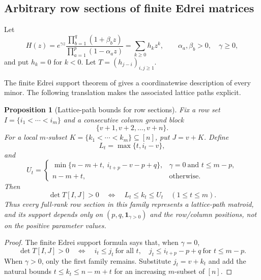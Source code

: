 \documentclass[11pt]{amsart}
\newtheorem{proposition}[theorem]{Proposition}
\theoremstyle{definition}
\theoremstyle{remark}
\newcommand{\one}{\mathbf 1}
\begin{document}
\subsection{Arbitrary row sections of finite Edrei matrices}

Let
\begin{equation}\label{eq:Edrei-H}
 H(z)=e^{\gamma z}
 \frac{\prod_{b=1}^{q}(1+\beta_bz)}
 {\prod_{a=1}^{p}(1-\alpha_az)}
 =\sum_{k\ge0}h_kz^k,
 \qquad \alpha_a,\beta_b>0,\quad\gamma\ge0,
\end{equation}
and put $h_k=0$ for $k<0$.  Let $T=(h_{j-i})_{i,j\ge1}$.

The finite Edrei support theorem of \cite[Theorem~23]{CGQlow} gives a coordinatewise description of every minor.  The following translation makes the associated lattice paths explicit.

\begin{proposition}[Lattice-path bounds for row sections]\label{prop:Edrei-lattice}
Fix a row set $I=\{i_1<\cdots<i_m\}$ and a consecutive column ground block
\[
 \{v+1,v+2,\ldots,v+n\}.
\]
For a local $m$-subset $K=\{k_1<\cdots<k_m\}\subseteq[n]$, put $J=v+K$.  Define
\begin{equation}\label{eq:Edrei-L}
 L_t=\max\{t,i_t-v\},
\end{equation}
and
\begin{equation}\label{eq:Edrei-U}
 U_t=
 \begin{cases}
 \min\{n-m+t,\ i_{t+p}-v-p+q\},
 &\gamma=0\ \text{and }t\le m-p,\\
 n-m+t,&\text{otherwise.}
 \end{cases}
\end{equation}
Then
\begin{equation}\label{eq:Edrei-basis}
 \det T[I,J]>0
 \quad\Longleftrightarrow\quad
 L_t\le k_t\le U_t\quad(1\le t\le m).
\end{equation}
Thus every full-rank row section in this family represents a lattice-path matroid, and its support depends only on $(p,q,\one_{\gamma>0})$ and the row/column positions, not on the positive parameter values.
\end{proposition}

\begin{proof}
The finite Edrei support formula says that, when $\gamma=0$,
\[
 \det T[I,J]>0
 \quad\Longleftrightarrow\quad
 i_t\le j_t\ \text{for all }t,
 \quad
 j_t\le i_{t+p}-p+q\ \text{for }t\le m-p.
\]
When $\gamma>0$, only the first family remains.  Substitute $j_t=v+k_t$ and add the natural bounds $t\le k_t\le n-m+t$ for an increasing $m$-subset of $[n]$.
\end{proof}
\end{document}
